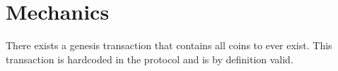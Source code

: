 \section{Mechanics}
  There exists a genesis transaction that contains all coins to ever exist. This transaction is hardcoded in the protocol and is by definition valid.
  \begin{center}
    \begin{dot2tex}[outputdir=dot2tex/, file=coinbase]
      
    \end{dot2tex}
  \end{center}
